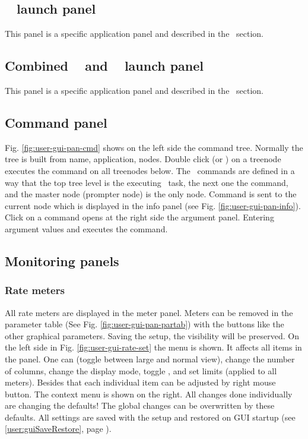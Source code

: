 {\subsection{\mbs~ launch panel}
This panel is a specific application panel and described in the \mbs\ section.
\subsection{Combined \dabc~ and \mbs~ launch panel}
This panel is a specific application panel and described in the \mbs\ section.
\subsection{Command panel}
Fig. \ref{fig:user-gui-pan-cmd} shows
on the left side the command tree. Normally the tree is built
from name, application, nodes. Double click (or ) on a treenode
executes the command on all treenodes below. The \mbs\ commands
are defined in a way that the top tree level is the executing \mbs\ task,
the next one the command, and the master node (prompter node) is the only node.
Command is sent to the current node which is displayed in the info panel
(see Fig. \ref{fig:user-gui-pan-info}).
Click on a command opens at the right side the argument panel.
Entering argument values and  executes the command.
\subsection{Monitoring panels}
\subsubsection{Rate meters}
All rate meters are displayed in the meter panel. Meters can be removed
in the parameter table (See Fig. \ref{fig:user-gui-pan-partab}) 
with the  buttons like the other graphical parameters.
Saving the setup, the visibility will be preserved.
On the left side in Fig. \ref{fig:user-gui-rate-set} the 
menu is shown. It affects all items in the panel. One can 
(toggle between large and normal view), change the number of
columns, change the display mode, toggle , and set limits
(applied to all meters). Besides that each individual item can be
adjusted by right mouse button. The context menu is shown on the right.
All changes done individually are changing the defaults!
The global changes can be overwritten by these defaults.
All settings are saved with the setup and restored on GUI startup
(see \ref{user:guiSaveRestore}, page \pageref{user:guiSaveRestore}).
}

